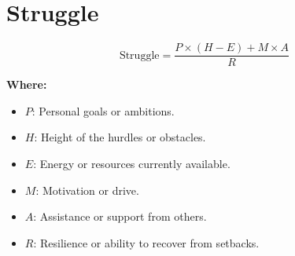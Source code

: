 \chapter{Struggle}

\begin{equation}
\text{Struggle} = \frac{P \times (H - E) + M \times A}{R} 
\end{equation}

\textbf{Where:}

\begin{itemize}
    \item $P$: Personal goals or ambitions.
    \item $H$: Height of the hurdles or obstacles.
    \item $E$: Energy or resources currently available.
    \item $M$: Motivation or drive.
    \item $A$: Assistance or support from others.
    \item $R$: Resilience or ability to recover from setbacks.
\end{itemize}